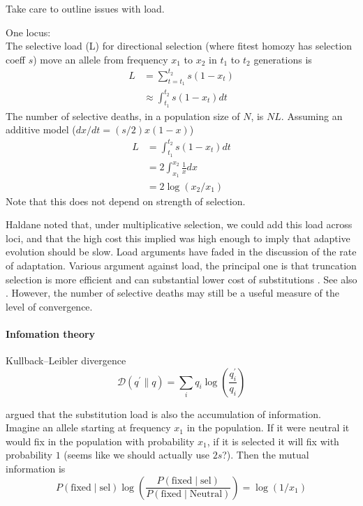 \documentclass[a4paper,10pt]{article}
\begin{document}

Take care to outline issues with load.

One locus:\\
The selective load (L) for directional selection (where fitest homozy
has selection coeff $s$) move an allele from frequency $x_1$ to $x_2$
in $t_1$ to $t_2$ generations is
\begin{align}
L &= \sum_{t=t_1}^{t_2} s(1-x_t) \\
&\approx \int_{t_1}^{t_2}  s(1-x_t) dt
\end{align}
The number of selective deaths, in a population size of $N$, is
$NL$. Assuming an additive model ($dx/dt = (s/2)x(1-x)$) 
\begin{align}
L &= \int_{t_1}^{t_2}  s(1-x_t) dt\\
&= 2  \int_{x_1}^{x_2}  \frac{1}{x} dx\\
& = 2 \log(x_2/x_1) 
\end{align}
Note that this does not depend on strength of selection.


Haldane noted that, under multiplicative selection, we could add this
load across loci, and that the high cost this implied was high enough
to imply that adaptive evolution should be slow. 
Load arguments have faded in the discussion of the rate of adaptation.
Various argument against load, the principal one is that truncation
selection is more efficient and can substantial lower cost of substitutions
\citep{smith1968haldane,sved1968possible}. See also \citet{EWENS1970}. However, the
number of selective deaths may still be a useful measure
of the level of convergence. 

\paragraph{Infomation theory}


Kullback–Leibler divergence 
\begin{equation}
\mathscr{D}(q^{\prime} \|  q) = \sum_i q_i \log \left( \frac{q_i^{\prime}}{q_i} \right)  \label{eqn:KL}
\end{equation}


\citet{kimura1961information} argued that the substitution load is
also the accumulation of information. Imagine an allele
starting at frequency $x_1$ in the population. If it were neutral it
would fix in the population with probability $x_1$, if it is selected it
will fix with probability $1$ (seems like we should actually use $2s$?).
Then the mutual information is 
\begin{equation}
P(\textrm{fixed} \mid \textrm{sel}) \log \left(\frac{P(\textrm{fixed} \mid \textrm{sel})}{P(\textrm{fixed}
    \mid \textrm{Neutral})} \right) =\log(1/x_1)
\end{equation}
\end{document}
